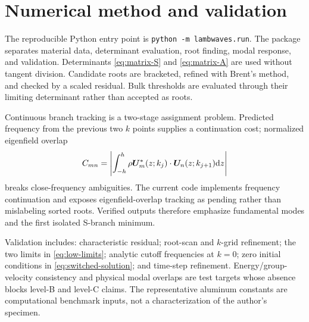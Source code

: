 \chapter{Numerical method and validation}\label{ch:numerics}
The reproducible Python entry point is \texttt{python -m lambwaves.run}. The
package separates material data, determinant evaluation, root finding, modal
response, and validation. Determinants \cref{eq:matrix-S} and \cref{eq:matrix-A} are used
without tangent division. Candidate roots are bracketed, refined with Brent's
method, and checked by a scaled residual. Bulk thresholds are evaluated through
their limiting determinant rather than accepted as roots.

Continuous branch tracking is a two-stage assignment problem. Predicted frequency
from the previous two $k$ points supplies a continuation cost; normalized
eigenfield overlap
\begin{equation}C_{mn}=\left|\int_{-h}^{h}\rho\bm{U}_m^*(z;k_j)
\cdot\bm{U}_n(z;k_{j+1})\mathrm{d} z\right|\label{eq:tracking-overlap}
\end{equation}
breaks close-frequency ambiguities. The current code implements frequency
continuation and exposes eigenfield-overlap tracking as pending rather than
mislabeling sorted roots. Verified outputs therefore emphasize fundamental modes
and the first isolated S-branch minimum.

Validation includes: characteristic residual; root-scan and $k$-grid refinement;
the two limits in \cref{eq:low-limits}; analytic cutoff frequencies at $k=0$;
zero initial conditions in \cref{eq:switched-solution}; and time-step refinement.
Energy/group-velocity consistency and physical modal overlaps are test targets
whose absence blocks level-B and level-C claims. The representative aluminum
constants are computational benchmark inputs, not a characterization of the
author's specimen.
